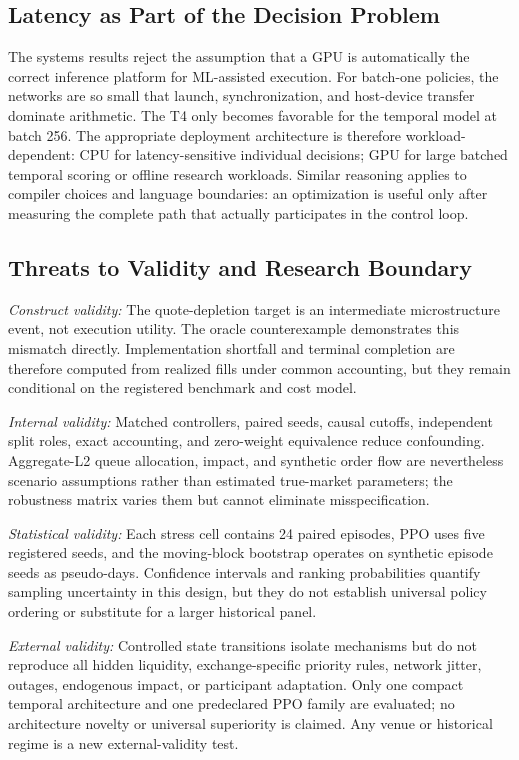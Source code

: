 \documentclass[journal,10pt]{IEEEtran}
\newcommand{\1}{\mathbf{1}}
\begin{document}
\subsection{Latency as Part of the Decision Problem}
The systems results reject the assumption that a GPU is automatically the correct inference platform for ML-assisted execution. For batch-one policies, the networks are so small that launch, synchronization, and host-device transfer dominate arithmetic. The T4 only becomes favorable for the temporal model at batch 256. The appropriate deployment architecture is therefore workload-dependent: CPU for latency-sensitive individual decisions; GPU for large batched temporal scoring or offline research workloads. Similar reasoning applies to compiler choices and language boundaries: an optimization is useful only after measuring the complete path that actually participates in the control loop.

\subsection{Threats to Validity and Research Boundary}
\textit{Construct validity:} The quote-depletion target is an intermediate microstructure event, not execution utility. The oracle counterexample demonstrates this mismatch directly. Implementation shortfall and terminal completion are therefore computed from realized fills under common accounting, but they remain conditional on the registered benchmark and cost model.

\textit{Internal validity:} Matched controllers, paired seeds, causal cutoffs, independent split roles, exact accounting, and zero-weight equivalence reduce confounding. Aggregate-L2 queue allocation, impact, and synthetic order flow are nevertheless scenario assumptions rather than estimated true-market parameters; the robustness matrix varies them but cannot eliminate misspecification.

\textit{Statistical validity:} Each stress cell contains 24 paired episodes, PPO uses five registered seeds, and the moving-block bootstrap operates on synthetic episode seeds as pseudo-days. Confidence intervals and ranking probabilities quantify sampling uncertainty in this design, but they do not establish universal policy ordering or substitute for a larger historical panel.

\textit{External validity:} Controlled state transitions isolate mechanisms but do not reproduce all hidden liquidity, exchange-specific priority rules, network jitter, outages, endogenous impact, or participant adaptation. Only one compact temporal architecture and one predeclared PPO family are evaluated; no architecture novelty or universal superiority is claimed. Any venue or historical regime is a new external-validity test.
\end{document}
